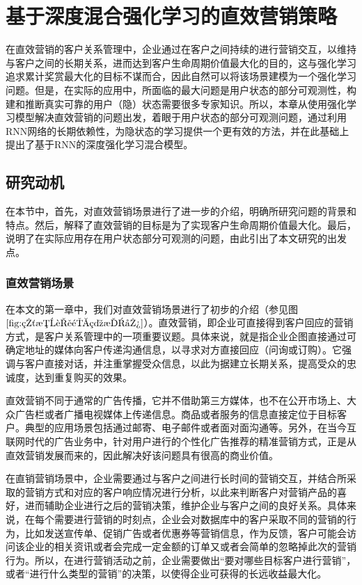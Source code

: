 \chapter{基于深度混合强化学习的直效营销策略}

在直效营销的客户关系管理中，企业通过在客户之间持续的进行营销交互，以维持与客户之间的长期关系，进而达到客户生命周期价值最大化的目的，这与强化学习追求累计奖赏最大化的目标不谋而合，因此自然可以将该场景建模为一个强化学习问题。但是，在实际的应用中，所面临的最大问题是用户状态的部分可观测性，构建和推断真实可靠的用户（隐）状态需要很多专家知识。所以，本章从使用强化学习模型解决直效营销的问题出发，着眼于用户状态的部分可观测问题，通过利用RNN网络的长期依赖性，为隐状态的学习提供一个更有效的方法，并在此基础上提出了基于RNN的深度强化学习混合模型。

\section{研究动机}
在本节中，首先，对直效营销场景进行了进一步的介绍，明确所研究问题的背景和特点。然后，解释了直效营销的目标是为了实现客户生命周期价值最大化。最后，说明了在实际应用存在用户状态部分可观测的问题，由此引出了本文研究的出发点。

\subsection{直效营销场景}
在本文的第一章中，我们对直效营销场景进行了初步的介绍（参见图$\ref{fig:直效营销示意图}$）。直效营销，即企业可直接得到客户回应的营销方式，是客户关系管理中的一项重要议题。具体来说，就是指企业企图直接通过可确定地址的媒体向客户传递沟通信息，以寻求对方直接回应（问询或订购）。它强调与客户直接对话，并注重掌握受众信息，以此为据建立长期关系，提高受众的忠诚度，达到重复购买的效果。

直效营销不同于通常的广告传播，它并不借助第三方媒体，也不在公开市场上、大众广告栏或者广播电视媒体上传递信息。商品或者服务的信息直接定位于目标客户。典型的应用场景包括通过邮寄、电子邮件或者面对面沟通等。另外，在当今互联网时代的广告业务中，针对用户进行的个性化广告推荐的精准营销方式，正是从直效营销发展而来的，因此解决好该问题具有很高的商业价值。

在直销营销场景中，企业需要通过与客户之间进行长时间的营销交互，并结合所采取的营销方式和对应的客户响应情况进行分析，以此来判断客户对营销产品的喜好，进而辅助企业进行之后的营销决策，维护企业与客户之间的良好关系。具体来说，在每个需要进行营销的时刻点，企业会对数据库中的客户采取不同的营销的行为，比如发送宣传单、促销广告或者优惠券等营销信息，作为反馈，客户可能会访问该企业的相关资讯或者会完成一定金额的订单又或者会简单的忽略掉此次的营销行为。所以，在进行营销活动之前，企业需要做出“要对哪些目标客户进行营销”，或者“进行什么类型的营销”的决策，以使得企业可获得的长远收益最大化。

